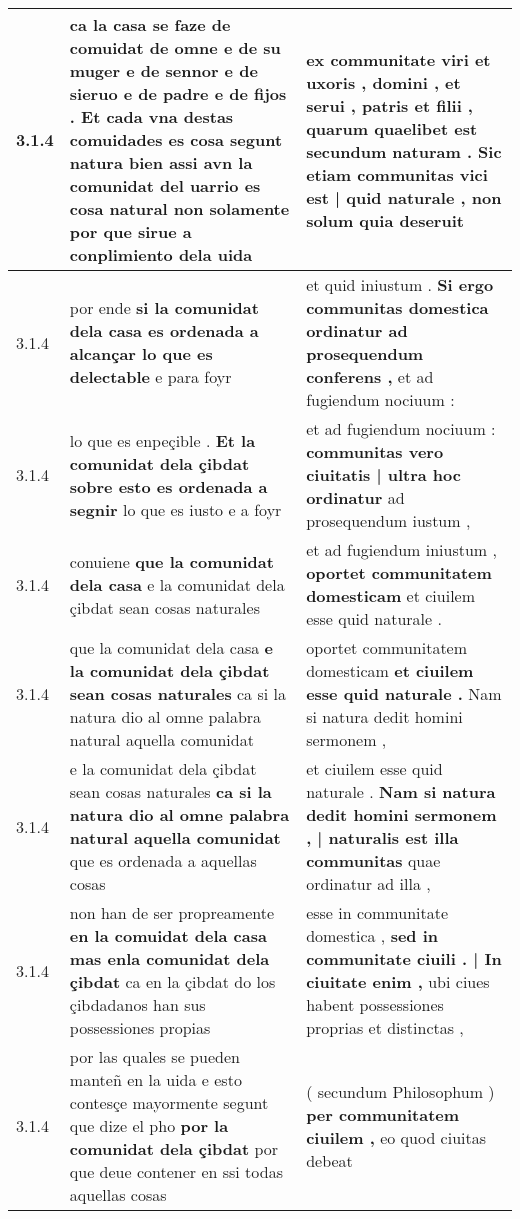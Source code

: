 \begin{tabular}{|p{1cm}|p{6.5cm}|p{6.5cm}|}
3.1.4 & ca la casa se faze de comuidat de omne e de su muger e de sennor e de sieruo e de padre e de fijos . Et cada vna destas comuidades es cosa segunt natura bien \textbf{ assi avn la comunidat del uarrio es cosa natural } non solamente por que sirue a conplimiento dela uida & ex communitate viri et uxoris , domini , et serui , patris et filii , quarum quaelibet est secundum naturam . \textbf{ Sic etiam communitas vici est | quid naturale , } non solum quia deseruit \\\hline
3.1.4 & por ende \textbf{ si la comunidat dela casa es ordenada a alcançar lo que es delectable } e para foyr & et quid iniustum . \textbf{ Si ergo communitas domestica ordinatur ad prosequendum conferens , } et ad fugiendum nociuum : \\\hline
3.1.4 & lo que es enpeçible . \textbf{ Et la comunidat dela çibdat sobre esto es ordenada a segnir } lo que es iusto e a foyr & et ad fugiendum nociuum : \textbf{ communitas vero ciuitatis | ultra hoc ordinatur } ad prosequendum iustum , \\\hline
3.1.4 & conuiene \textbf{ que la comunidat dela casa } e la comunidat dela çibdat sean cosas naturales & et ad fugiendum iniustum , \textbf{ oportet communitatem domesticam } et ciuilem esse quid naturale . \\\hline
3.1.4 & que la comunidat dela casa \textbf{ e la comunidat dela çibdat sean cosas naturales } ca si la natura dio al omne palabra natural aquella comunidat & oportet communitatem domesticam \textbf{ et ciuilem esse quid naturale . } Nam si natura dedit homini sermonem , \\\hline
3.1.4 & e la comunidat dela çibdat sean cosas naturales \textbf{ ca si la natura dio al omne palabra natural aquella comunidat } que es ordenada a aquellas cosas & et ciuilem esse quid naturale . \textbf{ Nam si natura dedit homini sermonem , | naturalis est illa communitas } quae ordinatur ad illa , \\\hline
3.1.4 & non han de ser propreamente \textbf{ en la comuidat dela casa mas enla comunidat dela çibdat } ca en la çibdat do los çibdadanos han sus possessiones propias & esse in communitate domestica , \textbf{ sed in communitate ciuili . | In ciuitate enim , } ubi ciues habent possessiones proprias et distinctas , \\\hline
3.1.4 & por las quales se pueden manteñ en la uida e esto contesçe mayormente segunt que dize el pho \textbf{ por la comunidat dela çibdat } por que deue contener en ssi todas aquellas cosas & ( secundum Philosophum ) \textbf{ per communitatem ciuilem , } eo quod ciuitas debeat \\\hline

\end{tabular}
